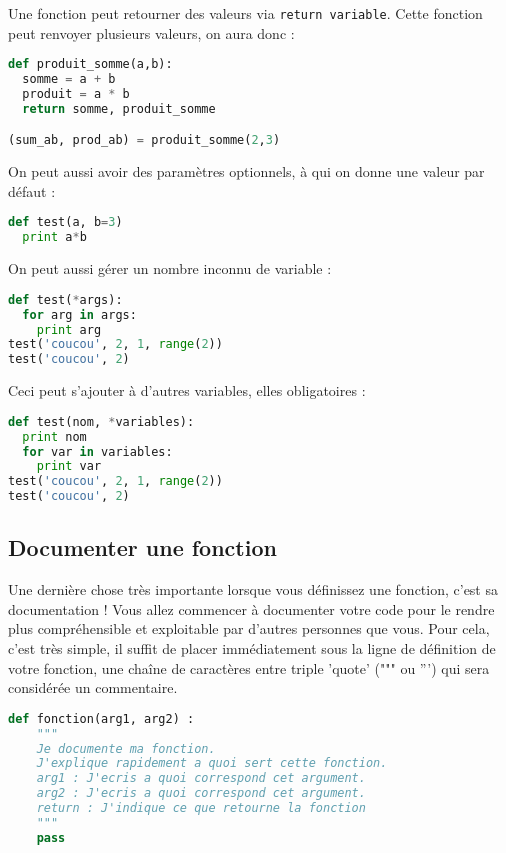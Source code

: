 \documentclass[a4paper,twoside]{article}
\begin{document}
Une fonction peut retourner des valeurs via \verb|return variable|. Cette fonction peut renvoyer plusieurs valeurs, on aura donc :
\begin{lstlisting}[language=python]
def produit_somme(a,b):
  somme = a + b
  produit = a * b
  return somme, produit_somme

(sum_ab, prod_ab) = produit_somme(2,3)
\end{lstlisting}

On peut aussi avoir des paramètres optionnels, à qui on donne une valeur par défaut :
\begin{lstlisting}[language=python]
def test(a, b=3)
  print a*b
\end{lstlisting}

On peut aussi gérer un nombre inconnu de variable :
\begin{lstlisting}[language=python]
def test(*args):
  for arg in args:
    print arg
test('coucou', 2, 1, range(2))
test('coucou', 2)
\end{lstlisting}

Ceci peut s'ajouter à d'autres variables, elles obligatoires :
\begin{lstlisting}[language=python]
def test(nom, *variables):
  print nom
  for var in variables:
    print var
test('coucou', 2, 1, range(2))
test('coucou', 2)
\end{lstlisting}

\subsection{Documenter une fonction}

Une dernière chose très importante lorsque vous définissez une fonction, c'est sa documentation ! Vous allez commencer à documenter votre code pour le rendre plus compréhensible et exploitable par d'autres personnes que vous. Pour cela, c'est très simple, il suffit de placer immédiatement sous la ligne de définition de votre fonction, une chaîne de caractères entre triple 'quote' (""" ou ''') qui sera considérée un commentaire.

\begin{lstlisting}[language=python]
def fonction(arg1, arg2) :
    """
    Je documente ma fonction. 
    J'explique rapidement a quoi sert cette fonction.
    arg1 : J'ecris a quoi correspond cet argument.
    arg2 : J'ecris a quoi correspond cet argument.
    return : J'indique ce que retourne la fonction
    """
    pass
\end{lstlisting}
\end{document}
